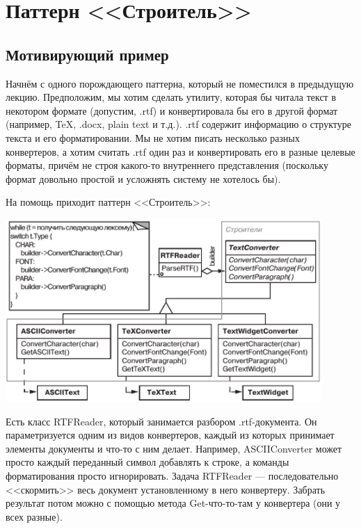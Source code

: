\documentclass{../text-style}
\author{Юрий Литвинов\\\small{y.litvinov@spbu.ru}}
\begin{document}
\maketitle
\thispagestyle{empty}

\section{Паттерн <<Строитель>>}

\subsection{Мотивирующий пример}

Начнём с одного порождающего паттерна, который не поместился в предыдущую лекцию. Предположим, мы хотим сделать утилиту, которая бы читала текст в некотором формате (допустим, .rtf) и конвертировала бы его в другой формат (например, TeX, .docx, plain text и т.д.). .rtf содержит информацию о структуре текста и его форматировании. Мы не хотим писать несколько разных конвертеров, а хотим считать .rtf один раз и конвертировать его в разные целевые форматы, причём не строя какого-то внутреннего представления (поскольку формат довольно простой и усложнять систему не хотелось бы).

На помощь приходит паттерн <<Строитель>>:

\begin{center}
    \includegraphics[width=0.9\textwidth]{textConverter.png}
\end{center}

Есть класс RTFReader, который занимается разбором .rtf-документа. Он параметризуется одним из видов конвертеров, каждый из которых принимает элементы документы и что-то с ним делает. Например, ASCIIConverter может просто каждый переданный символ добавлять к строке, а команды форматирования просто игнорировать. Задача RTFReader --- последовательно <<скормить>> весь документ установленному в него конвертеру. Забрать результат потом можно с помощью метода Get-что-то-там у конвертера (они у всех разные).
\end{document}
